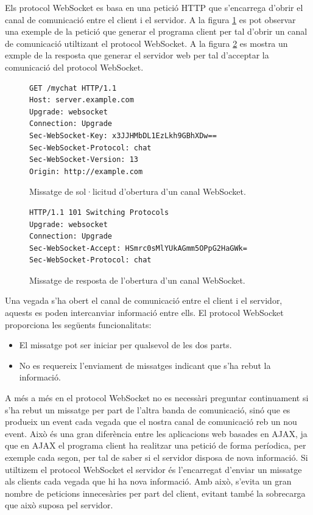 Els protocol WebSocket es basa en una petició HTTP que s'encarrega d'obrir el canal de comunicació entre el client i el servidor. A la figura \ref{fig:websocket-request} es pot observar una exemple de la petició que generar el programa client per tal d'obrir un canal de comunicació utiltizant el protocol WebSocket. A la figura \ref{fig:websocket-response} es mostra un exmple de la resposta que generar el servidor web per tal d'acceptar la comunicació del protocol WebSocket. 

\begin{figure}[htbp]
\centering
\begin{verbatim}
GET /mychat HTTP/1.1
Host: server.example.com
Upgrade: websocket
Connection: Upgrade
Sec-WebSocket-Key: x3JJHMbDL1EzLkh9GBhXDw==
Sec-WebSocket-Protocol: chat
Sec-WebSocket-Version: 13
Origin: http://example.com
\end{verbatim}
\caption{Missatge de sol·licitud d'obertura d'un canal WebSocket.}
\label{fig:websocket-request}
\end{figure} 

\begin{figure}[htbp]
\centering
\begin{verbatim}
HTTP/1.1 101 Switching Protocols
Upgrade: websocket
Connection: Upgrade
Sec-WebSocket-Accept: HSmrc0sMlYUkAGmm5OPpG2HaGWk=
Sec-WebSocket-Protocol: chat
\end{verbatim}
\caption{Missatge de resposta de l'obertura d'un canal WebSocket.}
\label{fig:websocket-response}
\end{figure} 

Una vegada s'ha obert el canal de comunicació entre el client i el servidor, aquests es poden intercanviar informació entre ells. El protocol WebSocket proporciona les següents funcionalitats: 

\begin{itemize}
    \item{El missatge pot ser iniciar per qualsevol de les dos parts.}
    \item{No es requereix l'enviament de missatges indicant que s'ha rebut la informació.}
\end{itemize}

A més a més en el protocol WebSocket no es necessàri preguntar continuament si s'ha rebut un missatge per part de l'altra banda de comunicació, sinó que es produeix un event cada vegada que el nostra canal de comunicació reb un nou event. Això és una gran diferència entre les aplicacions web basades en AJAX, ja que en AJAX el programa client ha realitzar una petició de forma períodica, per exemple cada segon, per tal de saber si el servidor disposa de nova informació. Si utiltizem el protocol WebSocket el servidor és l'encarregat d'enviar un missatge als clients cada vegada que hi ha nova informació. Amb això, s'evita un gran nombre de peticions innecesàries per part del client, evitant també la sobrecarga que això suposa pel servidor.

